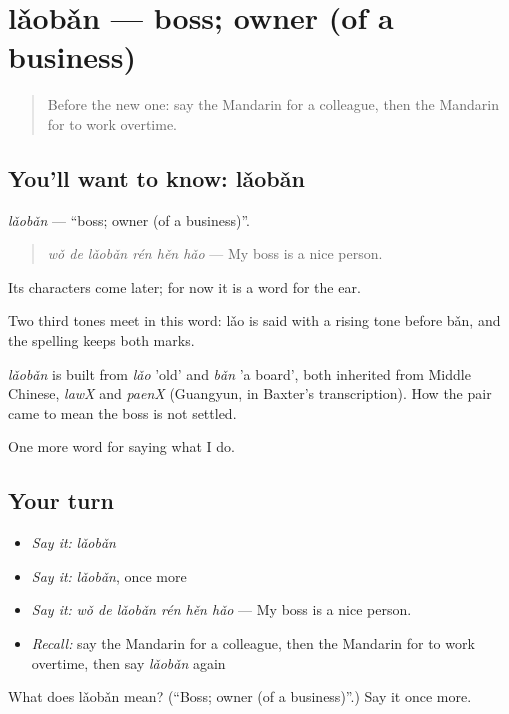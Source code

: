 \section[lǎobǎn]{lǎobǎn — boss; owner (of a business)}

\label{lesson:ZH-C255-laoban}



\begin{quote}
Before the new one: say the Mandarin for a colleague, then the Mandarin for to work overtime.
\end{quote}

\subsection*{You'll want to know: lǎobǎn}
\emph{lǎobǎn} — \textquotedblleft{}boss; owner (of a business)\textquotedblright{}.

\begin{quote}
\emph{wǒ de lǎobǎn rén hěn hǎo} — My boss is a nice person.
\end{quote}

Its characters come later; for now it is a word for the ear.

Two third tones meet in this word: lǎo is said with a rising tone before bǎn, and the spelling keeps both marks.

\begin{cousinweb}
\emph{lǎobǎn} is built from \emph{lǎo} 'old' and \emph{bǎn} 'a board', both inherited from Middle Chinese, \emph{lawX} and \emph{paenX} (Guangyun, in Baxter's transcription). How the pair came to mean the boss is not settled.
\end{cousinweb}

\begin{grammarlens}[title={What you've built}]
One more word for saying what I do.
\end{grammarlens}

\subsection*{Your turn}
\begin{itemize}
\raggedright
  \item \emph{Say it:} \emph{lǎobǎn}
  \item \emph{Say it:} \emph{lǎobǎn}, once more
  \item \emph{Say it:} \emph{wǒ de lǎobǎn rén hěn hǎo} — My boss is a nice person.
  \item \emph{Recall:} say the Mandarin for a colleague, then the Mandarin for to work overtime, then say \emph{lǎobǎn} again
\end{itemize}

\begin{tcolorbox}[breakable,colback=teal!4,colframe=teal!35!black,title={Before you move on}]
What does lǎobǎn mean? (\textquotedblleft{}Boss; owner (of a business)\textquotedblright{}.) Say it once more.
\end{tcolorbox}
